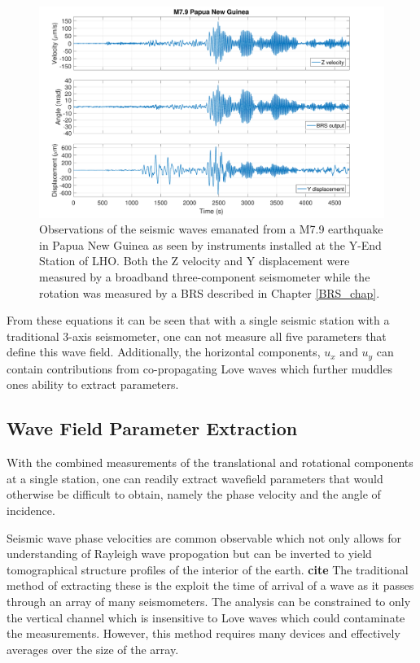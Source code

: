\documentclass [12pt, proquest]{uwthesis}[2019]
\begin{document}
\begin{figure}%
\begin{center}
\includegraphics[width=\textwidth]{PNGTimeSeries.pdf}
\caption{Observations of the seismic waves emanated from a M7.9 earthquake in Papua New Guinea as seen by instruments installed at the Y-End Station of LHO. \cite{tiltSeismology} Both the Z velocity and Y displacement were measured by a broadband three-component seismometer while the rotation was measured by a BRS described in Chapter \ref{BRS_chap}. }
\label{Earthquake}
\end{center}
\end{figure}

From these equations it can be seen that with a single seismic station with a traditional 3-axis seismometer, one can not measure all five parameters that define this wave field. Additionally, the horizontal components, $u_x\text{ and }u_y$ can contain contributions from co-propagating Love waves which further muddles ones ability to extract parameters. 


\subsection{Wave Field Parameter Extraction}

With the combined measurements of the translational and rotational components at a single station, one can readily extract wavefield parameters that would otherwise be difficult to obtain, namely the phase velocity and the angle of incidence. 

Seismic wave phase velocities are common observable which not only allows for understanding of Rayleigh wave propogation but can be inverted to yield tomographical structure profiles of the interior of the earth. \textbf{cite} The traditional method of extracting these is the exploit the time of arrival of a wave as it passes through an array of many seismometers. The analysis can be constrained to only the vertical channel which is insensitive to Love waves which could contaminate the measurements. However, this method requires many devices and effectively averages over the size of the array.
\end{document}
